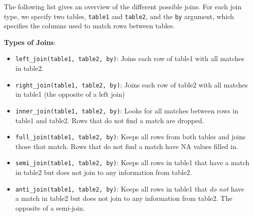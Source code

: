 \documentclass[
  letterpaper,
]{latex/krantz}
\providecommand{\tightlist}{%
  \setlength{\itemsep}{0pt}\setlength{\parskip}{0pt}}\usepackage{longtable,booktabs,array}
\begin{document}
The following list gives an overview of the different possible joins.
For each join type, we specify two tables, \texttt{table1} and
\texttt{table2}, and the \texttt{by} argument, which specifies the
columns used to match rows between tables.

\newpage

\textbf{Types of Joins}:

\begin{itemize}
\tightlist
\item
  \texttt{left\_join(table1,\ table2,\ by)}: Joins each row of table1
  with all matches in table2.
  \\
\item
  \texttt{right\_join(table1,\ table2,\ by)}: Joins each row of table2
  with all matches in table1 (the opposite of a left join)
  \\
\item
  \texttt{inner\_join(table1,\ table2,\ by)}: Looks for all matches
  between rows in table1 and table2. Rows that do not find a match are
  dropped.
  \\
\item
  \texttt{full\_join(table1,\ table2,\ by)}: Keeps all rows from both
  tables and joins those that match. Rows that do not find a match have
  NA values filled in.
  \\
\item
  \texttt{semi\_join(table1,\ table2,\ by)}: Keeps all rows in table1
  that have a match in table2 but does not join to any information from
  table2.
  \\
\item
  \texttt{anti\_join(table1,\ table2,\ by)}: Keeps all rows in table1
  that \emph{do not} have a match in table2 but does not join to any
  information from table2. The opposite of a semi-join.
\end{itemize}
\end{document}
